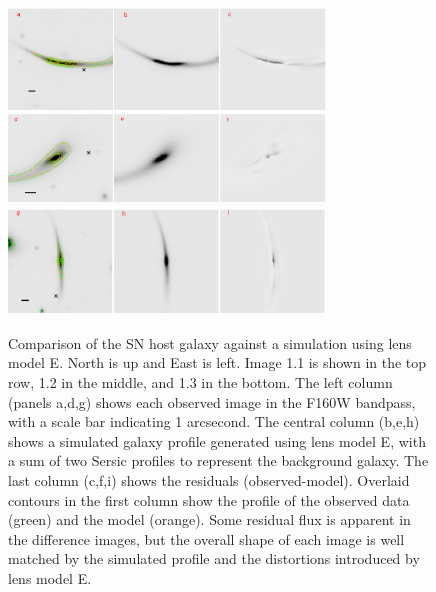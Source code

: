 \documentclass[12pt]{article}
\begin{document}
\begin{figure}
    \centering
    \includegraphics[width=0.75\textwidth]{Paper/Figures/host_image1_resid.pdf}\\
    \includegraphics[width=0.75\textwidth]{Paper/Figures/host_image2_resid.pdf}\\
    \includegraphics[width=0.75\textwidth]{Paper/Figures/host_image3_resid.pdf}
    \caption{Comparison of the SN host galaxy against a simulation using lens model E. North is up and East is left. Image 1.1 is shown in the top row, 1.2 in the middle, and 1.3 in the bottom. The left column (panels a,d,g) shows each observed image in the F160W bandpass, with a scale bar indicating 1 arcsecond.  The central column (b,e,h) shows a simulated galaxy profile generated using lens model E, with a sum of two Sersic  profiles to represent the background galaxy. The last column (c,f,i) shows the residuals (observed-model). 
    Overlaid contours in the first column show the profile of the observed data (green) and the model (orange).
    Some residual flux is apparent in the difference images, but the overall shape of each image is well matched by the simulated profile and the distortions introduced by lens model E.
    }
    \label{fig:host_model_residuals}
\end{figure}
\end{document}
